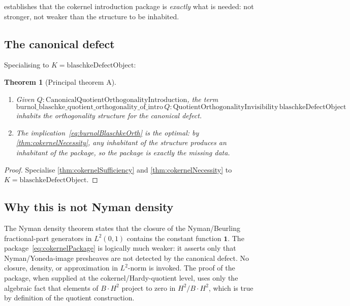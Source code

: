 \documentclass[12pt]{article}
\newtheorem{theorem}{Theorem}[section]
\theoremstyle{definition}
\theoremstyle{remark}
\newcommand{\HardyTwo}{H^{2}}
\newcommand{\BS}{B}
\begin{document}
 establishes that the cokernel introduction package is \emph{exactly} what is needed: not stronger, not weaker than the structure to be inhabited.

\subsection{The canonical defect}\label{subsec:cokernelCanonical}

Specialising to $K = \mathrm{blaschkeDefectObject}$:

\begin{theorem}[Principal theorem A]\label{thm:principalA}
\
\begin{enumerate}
  \item Given $Q : \mathrm{CanonicalQuotientOrthogonalityIntroduction}$, the term
  \begin{equation}\label{eq:burnolBlaschkeOrth}
    \mathrm{burnol\_blaschke\_quotient\_orthogonality\_of\_intro}\,Q
    : \mathrm{QuotientOrthogonalityInvisibility}\,\mathrm{blaschkeDefectObject}
  \end{equation}
  inhabits the orthogonality structure for the canonical defect.
  \item The implication~\eqref{eq:burnolBlaschkeOrth} is the optimal: by \cref{thm:cokernelNecessity}, any inhabitant of the structure produces an inhabitant of the package, so the package is exactly the missing data.
\end{enumerate}
\end{theorem}

\begin{proof}
Specialise \cref{thm:cokernelSufficiency} and \cref{thm:cokernelNecessity} to $K = \mathrm{blaschkeDefectObject}$.
\end{proof}

\subsection{Why this is not Nyman density}\label{subsec:notNymanDensity}

The Nyman density theorem states that the closure of the Nyman/Beurling fractional-part generators in $L^{2}(0,1)$ contains the constant function $\mathbf{1}$. The package~\eqref{eq:cokernelPackage} is logically much weaker: it asserts only that Nyman/Yoneda-image presheaves are not detected by the canonical defect. No closure, density, or approximation in $L^{2}$-norm is invoked. The proof of the package, when supplied at the cokernel/Hardy-quotient level, uses only the algebraic fact that elements of $\BS \cdot \HardyTwo$ project to zero in $\HardyTwo / \BS \cdot \HardyTwo$, which is true by definition of the quotient construction.
\end{document}
